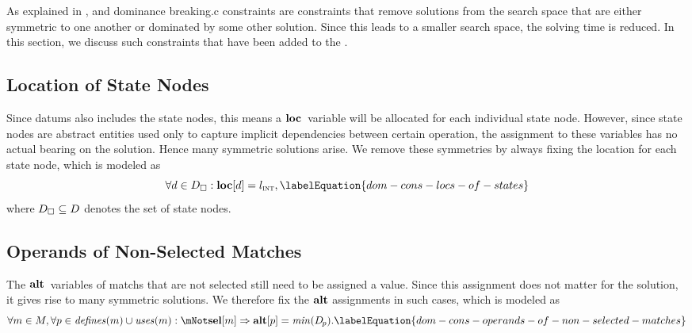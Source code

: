 As explained in ,  and \gls{dominance breaking.c} \glspl{constraint} are
\glspl{constraint} that remove \glspl{solution} from the \gls{search space} that
are either symmetric to one another or dominated by some other \gls{solution}.
%
Since this leads to a smaller \gls{search space}, the solving time is reduced.
%
In this section, we discuss such \glspl{constraint} that have been added to the
.


\subsection{Location of State Nodes}

Since \glspl{datum} also includes the \glspl{state node}, this means a
$\mVar{loc}$~\gls{variable} will be allocated for each individual \gls{state
  node}.
%
However, since \glspl{state node} are abstract entities used only to capture
implicit dependencies between certain \gls{operation}, the assignment to these
\glspl{variable} has no actual bearing on the \gls{solution}.
%
Hence many symmetric \glspl{solution} arise.
%
We remove these symmetries by always fixing the \gls{location} for each
\gls{state node}, which is modeled as
%
\begin{equation}
  \forall d \in \mStateDataSet :
  \mVar{loc}[d] = \mIntLocation,
  \labelEquation{dom-cons-locs-of-states}
\end{equation}
%
where \mbox{$\mStateDataSet \subseteq \mDataSet$} denotes the set of
\glspl{state node}.


\subsection{Operands of Non-Selected Matches}

The $\mVar{alt}$~\glspl{variable} of \glspl{match} that are not selected still
need to be assigned a value.
%
Since this assignment does not matter for the \gls{solution}, it gives rise to
many symmetric \glspl{solution}.
%
We therefore fix the $\mVar{alt}$ assignments in such cases, which is modeled as
%
\begin{equation}
  \forall m \in \mMatchSet,
  \forall p \in \mDefines(m) \cup \mUses(m) :
  \mNot\mVar{sel}[m] \mImp \mVar{alt}[p] = \mMin(\mDataSet[\hspace{-1pt}p]).
  \labelEquation{dom-cons-operands-of-non-selected-matches}
\end{equation}

